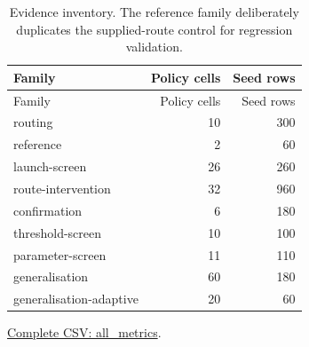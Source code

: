 \begin{center}\small
\begin{longtable}{lrr}
\caption{Evidence inventory. The reference family deliberately duplicates the supplied-route control for regression validation.}\\
\toprule
Family & Policy cells & Seed rows \\
\midrule\endfirsthead
\toprule
Family & Policy cells & Seed rows \\
\midrule\endhead
routing & 10 & 300 \\
reference & 2 & 60 \\
launch-screen & 26 & 260 \\
route-intervention & 32 & 960 \\
confirmation & 6 & 180 \\
threshold-screen & 10 & 100 \\
parameter-screen & 11 & 110 \\
generalisation & 60 & 180 \\
generalisation-adaptive & 20 & 60 \\
\bottomrule\end{longtable}\end{center}
{\footnotesize \href{https://github.com/sanjeevkrishnaa/Compiler-Driven-ACE/blob/codex/ace-scheduler-correctness/docs/latex/oct25_pre_golden/data/all_metrics.csv}{Complete CSV: all\_metrics}. }
